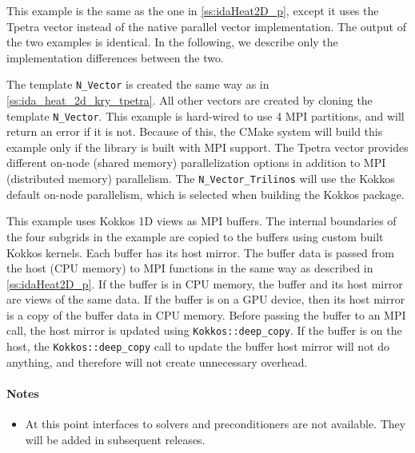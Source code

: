 This example is the same as the one in \ref{ss:idaHeat2D_p}, except 
it uses the Tpetra vector instead of the native {\sundials} parallel vector 
implementation. The output of the two examples is identical. In the following, 
we describe only the implementation differences between the two. 

The template \verb|N_Vector| is created the same way as in
\ref{ss:ida_heat_2d_kry_tpetra}. All other vectors are created by
cloning the template \verb|N_Vector|. This example is hard-wired to use
4 MPI partitions, and will return an error if it is not.
Because of this, the {\sundials} CMake system will build this example only
if the {\trilinos} library is built with MPI support.
The Tpetra vector provides different on-node (shared memory)
parallelization options in addition to MPI (distributed memory) parallelism.
The \verb|N_Vector_Trilinos| will use the Kokkos default on-node
parallelism, which is selected when building the Kokkos package. 

This example uses Kokkos 1D views \cite{edwards2014kokkos} as MPI buffers. The internal
boundaries of the four subgrids in the example are copied to the buffers using custom built
Kokkos kernels. Each buffer has its host mirror. The buffer data is passed from
the host (CPU memory) to MPI functions in the same way as described in \ref{ss:idaHeat2D_p}. 
If the buffer is in CPU memory,
the buffer and its host mirror are views of the same data. If the buffer is on
a GPU device, then its host mirror is a copy of the buffer data in CPU memory.
Before passing the buffer to an MPI call, the host mirror is updated using
\verb|Kokkos::deep_copy|. If the buffer is
on the host, the \verb|Kokkos::deep_copy| call to update the buffer host mirror will
not do anything, and therefore will not create unnecessary overhead.

\paragraph{\bf Notes} 
           
\begin{itemize}
                                        
\item
  {\warn}At this point interfaces to {\trilinos} solvers and preconditioners are 
  not available. They will be added in subsequent {\sundials} releases. 

\end{itemize}




